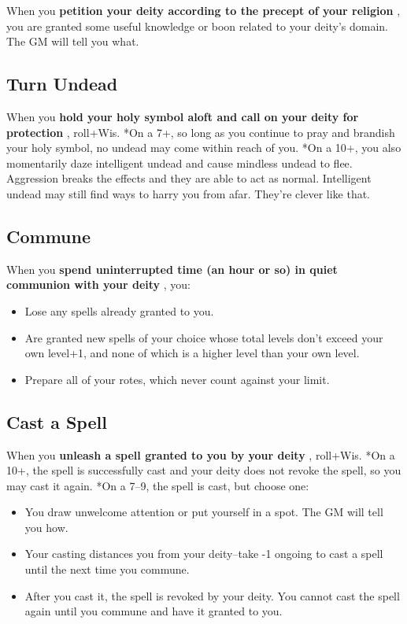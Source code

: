  When you \textbf{petition your deity according to the precept of your religion}
, you are granted some useful knowledge or boon related to your deity's domain. The GM will tell you what.
\subsection{Turn Undead}


 When you \textbf{hold your holy symbol aloft and call on your deity for protection}
, roll+Wis. *On a 7+, so long as you continue to pray and brandish your holy symbol, no undead may come within reach of you. *On a 10+, you also momentarily daze intelligent undead and cause mindless undead to flee. Aggression breaks the effects and they are able to act as normal. Intelligent undead may still find ways to harry you from afar. They're clever like that.
\subsection{Commune}


 When you \textbf{spend uninterrupted time (an hour or so) in quiet communion with your deity}
, you:
\begin{itemize}
\item Lose any spells already granted to you.
\item Are granted new spells of your choice whose total levels don't exceed your own level+1, and none of which is a higher level than your own level.
\item Prepare all of your rotes, which never count against your limit.

\end{itemize}
\subsection{Cast a Spell}


 When you \textbf{unleash a spell granted to you by your deity}
, roll+Wis. *On a 10+, the spell is successfully cast and your deity does not revoke the spell, so you may cast it again. *On a 7--9, the spell is cast, but choose one:
\begin{itemize}
\item You draw unwelcome attention or put yourself in a spot. The GM will tell you how.
\item Your casting distances you from your deity--take -1 ongoing to cast a spell until the next time you commune.
\item After you cast it, the spell is revoked by your deity. You cannot cast the spell again until you commune and have it granted to you.

\end{itemize}


